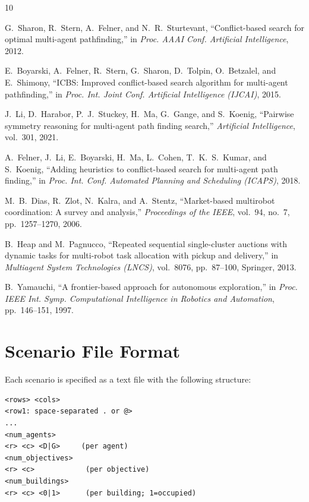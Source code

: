 \documentclass[conference]{IEEEtran}
\begin{document}

\begin{thebibliography}{10}

G.~Sharon, R.~Stern, A.~Felner, and N.~R.~Sturtevant,
``Conflict-based search for optimal multi-agent pathfinding,''
in \emph{Proc. AAAI Conf. Artificial Intelligence}, 2012.

E.~Boyarski, A.~Felner, R.~Stern, G.~Sharon, D.~Tolpin, O.~Betzalel, and E.~Shimony,
``ICBS: Improved conflict-based search algorithm for multi-agent pathfinding,''
in \emph{Proc. Int. Joint Conf. Artificial Intelligence (IJCAI)}, 2015.

J.~Li, D.~Harabor, P.~J.~Stuckey, H.~Ma, G.~Gange, and S.~Koenig,
``Pairwise symmetry reasoning for multi-agent path finding search,''
\emph{Artificial Intelligence}, vol.~301, 2021.

A.~Felner, J.~Li, E.~Boyarski, H.~Ma, L.~Cohen, T.~K.~S.~Kumar, and S.~Koenig,
``Adding heuristics to conflict-based search for multi-agent path finding,''
in \emph{Proc. Int. Conf. Automated Planning and Scheduling (ICAPS)}, 2018.

M.~B.~Dias, R.~Zlot, N.~Kalra, and A.~Stentz,
``Market-based multirobot coordination: A survey and analysis,''
\emph{Proceedings of the IEEE}, vol.~94, no.~7, pp.~1257--1270, 2006.

B.~Heap and M.~Pagnucco,
``Repeated sequential single-cluster auctions with dynamic tasks for multi-robot task allocation with pickup and delivery,''
in \emph{Multiagent System Technologies (LNCS)}, vol.~8076, pp.~87--100, Springer, 2013.

B.~Yamauchi,
``A frontier-based approach for autonomous exploration,''
in \emph{Proc. IEEE Int. Symp. Computational Intelligence in Robotics and Automation}, pp.~146--151, 1997.

\end{thebibliography}

\appendix

\section{Scenario File Format}

Each scenario is specified as a text file with the following structure:
\begin{verbatim}
<rows> <cols>
<row1: space-separated . or @>
...
<num_agents>
<r> <c> <D|G>     (per agent)
<num_objectives>
<r> <c>            (per objective)
<num_buildings>
<r> <c> <0|1>      (per building; 1=occupied)
\end{verbatim}
\end{document}

